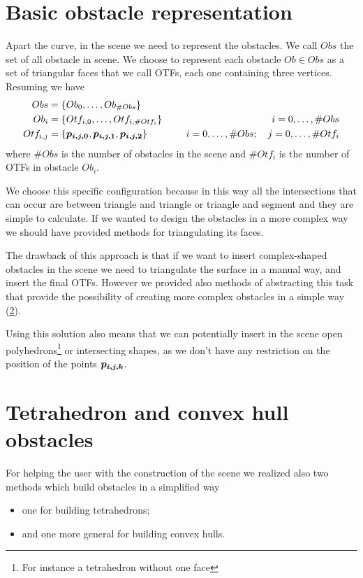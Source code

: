\documentclass[dissertation.tex]{subfiles}
\begin{document}
\section{Basic obstacle representation}
Apart the curve, in the scene we need to represent the obstacles. We
call $Obs$ the set of all obstacle in scene. We choose to represent
each obstacle $Ob\in Obs$ as a set of triangular faces that we call
\acp{OTF}, each one containing three vertices. Resuming we have
\begin{equation*}
  \begin{split}
    Obs&=\{Ob_0,\dots,Ob_{\#Obs}\}\\
    Ob_i&=\{Otf_{i,0},\dots,Otf_{i,\#Otf_i}\}&i=0,\dots,\#Obs\\
    Otf_{i,j}&=\{\boldsymbol{p_{i,j,0}},\boldsymbol{p_{i,j,1}},\boldsymbol{p_{i,j,2}}\}\quad\qquad&
    i=0,\dots,\#Obs;\quad j=0,\dots,\#Otf_i
  \end{split}
\end{equation*}
where $\#Obs$ is the number of obstacles in the scene and $\#Otf_i$ is
the number of \acp{OTF} in obstacle $Ob_i$.

We choose this specific configuration because in this way all the
intersections that can occur are between triangle and triangle or
triangle and segment and they are simple to calculate. If we wanted to
design the obstacles in a more complex way we should have provided
methods for triangulating its faces. 

The drawback of this approach is that if we want to insert
complex-shaped obstacles in the scene we need to triangulate the
surface in a manual way, and insert the final \acp{OTF}. However we
provided also methods
of abstracting this task that provide the possibility of creating more
complex obstacles in a simple way (\cref{sec:complexObs}).

Using this solution also means that we can potentially insert in the
scene open polyhedrons\footnote{For instance a tetrahedron without one
  face} or intersecting shapes, as we don't have
any restriction on the position of the points $\boldsymbol{p_{i,j,k}}$.

\section{Tetrahedron and convex hull obstacles}\label{sec:complexObs}
For helping the user with the construction of the scene we realized
also two methods which build obstacles in a simplified way
\begin{itemize}
\item one for building tetrahedrons;
\item and one more general for building convex hulls.
\end{itemize}
\end{document}
